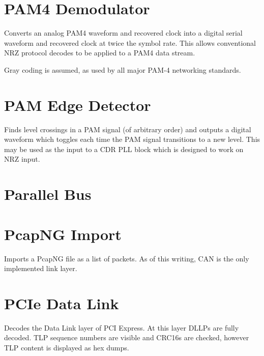 \section{PAM4 Demodulator}

Converts an analog PAM4 waveform and recovered clock into a digital serial waveform and recovered clock at twice the
symbol rate. This allows conventional NRZ protocol decodes to be applied to a PAM4 data stream.

Gray coding is assumed, as used by all major PAM-4 networking standards.

\pagebreak
\section{PAM Edge Detector}

Finds level crossings in a PAM signal (of arbitrary order) and outputs a digital waveform which toggles each time the
PAM signal transitions to a new level. This may be used as the input to a CDR PLL block which is designed to work on
NRZ input.

\pagebreak
\section{Parallel Bus}

\pagebreak
\section{PcapNG Import}

Imports a PcapNG file as a list of packets. As of this writing, CAN is the only implemented link layer.

\pagebreak
\section{PCIe Data Link}

Decodes the Data Link layer of PCI Express. At this layer DLLPs are fully decoded. TLP sequence numbers are visible
and CRC16s are checked, however TLP content is displayed as hex dumps.


